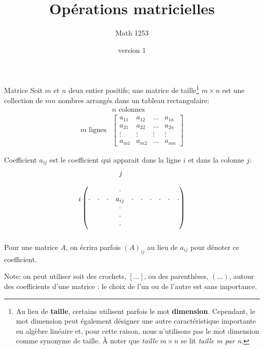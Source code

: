 \documentclass[french]{beamer}
\title{Opérations matricielles}
\author{Math 1253} %
\date{version 1}   %
\begin{document}
	\frame{\titlepage}
	
	\begin{frame}
	\begin{block}{Matrice}
	Soit $m$ et $n$ deux entier positifs; une matrice de taille\footnote{Au lieu de \textbf{taille}, 
		certains utilisent parfois le mot \textbf{dimension}.  
		Cependant, le mot dimension peut également désigner une autre caractéristique importante en algèbre linéaire et,
		pour cette raison, nous n'utilisons pas le mot dimension comme synonyme de taille. 
		À noter que \textit{taille $m\times n$} se lit \textit{taille m par n}.} $m\times n$
	est une collection de $mn$ nombres arrangés dans un tableau rectangulaire:
	\[
	\begin{matrix}
	&\text{$n$ colonnes} \\
	\text{$m$ lignes}& \begin{bmatrix}
	a_{11} & a_{12} & \ldots & a_{1n}\\
	a_{21} & a_{22} & \ldots & a_{2n}\\
	\vdots & \vdots & \vdots & \vdots \\
	a_{m1} & a_{m2} & \ldots & a_{mn}
	\end{bmatrix}
	\end{matrix}
	\]
	\end{block}
	\end{frame}
	
	\begin{frame}
		\begin{block}{Coefficient}
		$a_{ij}$ est le coefficient qui apparait dans la ligne $i$ et dans la colonne $j$:
		\[
		\begin{matrix}
		j\hspace*{1.1cm} \\
		\begin{matrix}\\ \\ i \\ \\ \\ \\ \\ \end{matrix}
		\begin{pmatrix}
		&&&\cdot&&&&&& \\
		\cdot&\cdot&\cdot&a_{ij}&\cdot&\cdot&\cdot&\cdot&\cdot&\cdot\\
		&&&\cdot&&&&&&\\
		&&&\cdot&&&&&&\\
		&&&\cdot&&&&&&
		\end{pmatrix}
		\end{matrix}
		\]
		Pour une matrice $A$, on écrira parfois $(A)_{ij}$ au lieu de $a_{ij}$ pour dénoter ce coefficient.
	\end{block}
	Note: on peut utiliser soit des crochets, $[...]$, ou des parenthèses, $(...)$, autour des coefficients d'une matrice : le choix de l'un ou de l'autre est sans importance.
	\end{frame}
\end{document}
